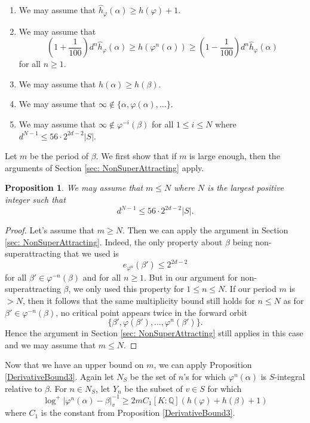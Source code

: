 \documentclass[10pt, reqno]{amsart}
\newcommand{\bb}{\mathbb}
\newcommand{\vphi}{\varphi}
\newcommand{\h}{\widehat{h}}
\numberwithin{theorem}{section}
\newtheorem{proposition}[theorem]{Proposition}
\numberwithin{equation}{section}
\numberwithin{example}{section}
\numberwithin{definition}{section}
\begin{document}
\begin{enumerate}
\item We may assume that $\h_{\vphi}(\alpha) \geq h(\vphi) + 1$.

\item We may assume that 
$$\left(1+ \frac{1}{100} \right) d^n \h_{\vphi}(\alpha) \geq h(\vphi^n(\alpha)) \geq \left(1 - \frac{1}{100} \right) d^n \h_{\vphi}(\alpha)$$
for all $n \geq 1$. 

\item We may assume that $h(\alpha) \geq h(\beta)$.

\item We may assume that $\infty \not \in \{\alpha,\vphi(\alpha),\ldots\}$. 

\item We may assume that $\infty \not \in \vphi^{-i}(\beta)$ for all $1 \leq i \leq N$ where $d^{N-1} \leq 56 \cdot 2^{2d-2} |S|$.
\end{enumerate}


Let $m$ be the period of $\beta$. We first show that if $m$ is large enough, then the arguments of Section \ref{sec: NonSuperAttracting} apply.

\begin{proposition} \label{SuperAttractingBound1}
We may assume that $m \leq N$ where $N$ is the largest positive integer such that 
$$d^{N-1} \leq 56 \cdot 2^{2d-2} |S|.$$
\end{proposition}

\begin{proof}
Let's assume that $m \geq N$. Then we can apply the argument in Section \ref{sec: NonSuperAttracting}. Indeed, the only property about $\beta$ being non-superattracting that we used is  
$$e_{\vphi^n}(\beta') \leq 2^{2d-2}$$
for all $\beta' \in \vphi^{-n}(\beta)$ and for all $n \geq 1$. But in our argument for non-superattracting $\beta$, we only used this property for $1 \leq n \leq N$. If our period $m$ is $> N$, then it follows that the same multiplicity bound still holds for $n \leq N$ as for $\beta' \in \vphi^{-n}(\beta)$, no critical point appears twice in the forward orbit 
$$\{\beta', \vphi(\beta'),\ldots, \vphi^n(\beta')\}.$$
Hence the argument in Section \ref{sec: NonSuperAttracting} still applies in this case and we may assume that $m \leq N$. 
\end{proof}

Now that we have an upper bound on $m$, we can apply Proposition \ref{DerivativeBound3}. Again let $N_S$ be the set of $n$'s for which $\vphi^n(\alpha)$ is $S$-integral relative to $\beta$. For $n \in N_S$, let $Y_n$ be the subset of $v \in S$ for which 
$$\log^+|\vphi^n(\alpha) - \beta|^{-1}_v \geq 2m C_1 [K:\bb{Q}] (h(\vphi) + h(\beta)+1)$$
where $C_1$ is the constant from Proposition \ref{DerivativeBound3}.
\end{document}
